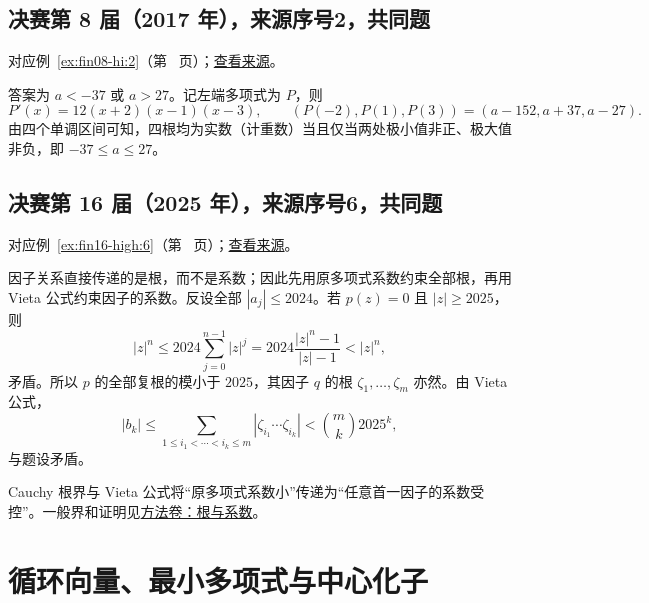 \documentclass[12pt,fontset=fandol]{ctexart}
\begin{document}
\subsection{决赛第 8 届（2017 年），来源序号2，共同题}\label{ans:fin08-hi:2}\label{pr:fin08-hi:2}

对应例~\ref{ex:fin08-hi:2}（第~\pageref{ex:fin08-hi:2} 页）；\href{https://github.com/lzxcr/cmc-mathematics/blob/64916fa1fdbc3e444a652eca204d5669058ee321/src/problems/finals/08/02.md}{查看来源}。

\begin{solve}

答案为 $a<-37$ 或 $a>27$。记左端多项式为 $P$，则
\[
P'(x)=12(x+2)(x-1)(x-3),\qquad(P(-2),P(1),P(3))=(a-152,a+37,a-27).
\]
由四个单调区间可知，四根均为实数（计重数）当且仅当两处极小值非正、极大值非负，即 $-37\leq a\leq27$。

\end{solve}

\subsection{决赛第 16 届（2025 年），来源序号6，共同题}\label{ans:fin16-high:6}\label{pr:fin16-high:6}

对应例~\ref{ex:fin16-high:6}（第~\pageref{ex:fin16-high:6} 页）；\href{https://github.com/lzxcr/cmc-mathematics/blob/64916fa1fdbc3e444a652eca204d5669058ee321/src/problems/finals/16/06.md}{查看来源}。

\begin{solve}

因子关系直接传递的是根，而不是系数；因此先用原多项式系数约束全部根，再用 Vieta 公式约束因子的系数。反设全部 $|a_j|\le2024$。若 $p(z)=0$ 且 $|z|\ge2025$，则
\[
|z|^n\le2024\sum_{j=0}^{n-1}|z|^j
=2024\frac{|z|^n-1}{|z|-1}<|z|^n,
\]
矛盾。所以 $p$ 的全部复根的模小于 $2025$，其因子 $q$ 的根 $\zeta_1,\dots,\zeta_m$ 亦然。由 Vieta 公式，
\[
|b_k|\le\sum_{1\le i_1<\cdots<i_k\le m}|\zeta_{i_1}\cdots\zeta_{i_k}|
<\binom mk2025^k,
\]
与题设矛盾。

\end{solve}

\begin{remark}[方法与条件]

Cauchy 根界与 Vieta 公式将“原多项式系数小”传递为“任意首一因子的系数受控”。一般界和证明见\hyperref[app:algebra-roots]{方法卷：根与系数}。

\end{remark}

\section{循环向量、最小多项式与中心化子}
\end{document}

